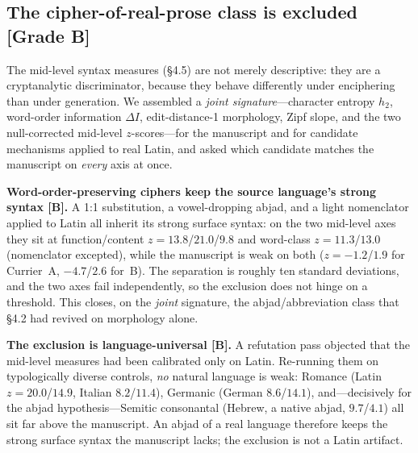 \documentclass[11pt]{article}
\newcommand{\grade}[1]{{\small\textbf{[#1]}}}
\begin{document}
\subsection{The cipher-of-real-prose class is excluded \grade{Grade B}}
The mid-level syntax measures (\S4.5) are not merely descriptive: they are a
cryptanalytic discriminator, because they behave differently under enciphering than
under generation. We assembled a \emph{joint signature}---character entropy $h_2$,
word-order information $\Delta I$, edit-distance-1 morphology, Zipf slope, and the two
null-corrected mid-level $z$-scores---for the manuscript and for candidate mechanisms
applied to real Latin, and asked which candidate matches the manuscript on
\emph{every} axis at once.

\textbf{Word-order-preserving ciphers keep the source language's strong syntax
\grade{B}.} A 1:1 substitution, a vowel-dropping abjad, and a light nomenclator applied
to Latin all inherit its strong surface syntax: on the two mid-level axes they sit at
function/content $z=13.8$/$21.0$/$9.8$ and word-class $z=11.3$/$13.0$ (nomenclator
excepted), while the manuscript is weak on both ($z=-1.2$/$1.9$ for Currier~A,
$-4.7$/$2.6$ for~B). The separation is roughly ten standard deviations, and the two
axes fail independently, so the exclusion does not hinge on a threshold. This closes,
on the \emph{joint} signature, the abjad/abbreviation class that \S4.2 had revived on
morphology alone.

\textbf{The exclusion is language-universal \grade{B}.} A refutation pass objected
that the mid-level measures had been calibrated only on Latin. Re-running them on
typologically diverse controls, \emph{no} natural language is weak: Romance (Latin
$z=20.0$/$14.9$, Italian $8.2$/$11.4$), Germanic (German $8.6$/$14.1$), and---decisively
for the abjad hypothesis---Semitic consonantal (Hebrew, a native abjad, $9.7$/$4.1$)
all sit far above the manuscript. An abjad of a real language therefore keeps the
strong surface syntax the manuscript lacks; the exclusion is not a Latin artifact.
\end{document}
